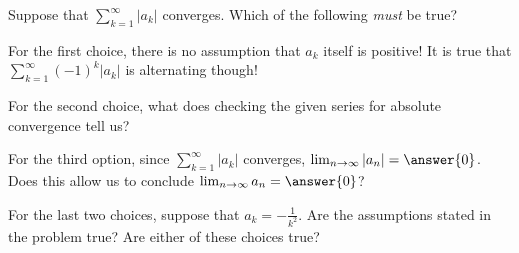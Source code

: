 \documentclass{ximera}
\author{Jim Talamo}
\begin{document}
\begin{exercise}
Suppose that $\sum_{k=1}^{\infty} |a_k|$ converges.  Which of the following \emph{must} be true?  

\begin{selectAll}
\end{selectAll}

\begin{hint}
For the first choice, there is no assumption that $a_k$ itself is positive!  It is true that $\sum_{k=1}^{\infty} (-1)^k |a_k|$ is alternating though!

For the second choice, what does checking the given series for absolute convergence tell us?

For the third option, since $\sum_{k=1}^{\infty} |a_k|$ converges, $\lim_{n \to \infty} |a_n| = \answer{0}$.  Does this allow us to conclude $\lim_{n \to \infty} a_n = \answer{0}$?

For the last two choices, suppose that $a_k = -\frac{1}{k^2}$.   Are the assumptions stated in the problem true?  Are either of these choices true?
\end{hint}

\end{exercise}
\end{document}
